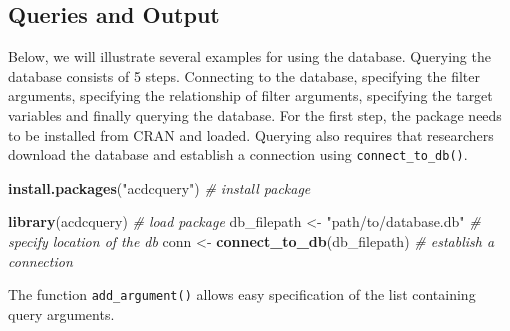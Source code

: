 \documentclass[
  man,floatsintext]{apa6}
\newenvironment{Shaded}{\begin{snugshade}}{\end{snugshade}}
\newcommand{\CommentTok}[1]{\textcolor[rgb]{0.56,0.35,0.01}{\textit{#1}}}
\newcommand{\FunctionTok}[1]{\textcolor[rgb]{0.13,0.29,0.53}{\textbf{#1}}}
\newcommand{\NormalTok}[1]{#1}
\newcommand{\OtherTok}[1]{\textcolor[rgb]{0.56,0.35,0.01}{#1}}
\newcommand{\StringTok}[1]{\textcolor[rgb]{0.31,0.60,0.02}{#1}}
\begin{document}
\hypertarget{queries-and-output}{%
\subsection{Queries and Output}\label{queries-and-output}}

Below, we will illustrate several examples for using the database. Querying the database consists of 5 steps. Connecting to the database, specifying the filter arguments, specifying the relationship of filter arguments, specifying the target variables and finally querying the database. For the first step, the package needs to be installed from CRAN and loaded. Querying also requires that researchers download the database and establish a connection using \texttt{connect\_to\_db()}.

\begin{Shaded}
\begin{Highlighting}[]
\FunctionTok{install.packages}\NormalTok{(}\StringTok{"acdcquery"}\NormalTok{) }\CommentTok{\# install package}

\FunctionTok{library}\NormalTok{(acdcquery) }\CommentTok{\# load package}
\NormalTok{db\_filepath }\OtherTok{\textless{}{-}} \StringTok{"path/to/database.db"} \CommentTok{\# specify location of the db}
\NormalTok{conn }\OtherTok{\textless{}{-}} \FunctionTok{connect\_to\_db}\NormalTok{(db\_filepath) }\CommentTok{\# establish a connection}
\end{Highlighting}
\end{Shaded}

The function \texttt{add\_argument()} allows easy specification of the list containing query arguments.
\end{document}
